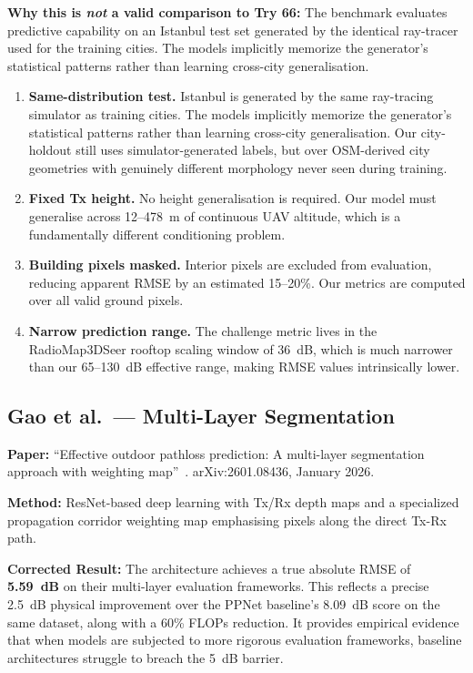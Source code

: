 \documentclass[11pt,a4paper]{article}
\begin{document}
\textbf{Why this is \emph{not} a valid comparison to Try 66:} The benchmark evaluates predictive capability on an Istanbul test set generated by the identical ray-tracer used for the training cities. The models implicitly memorize the generator's statistical patterns rather than learning cross-city generalisation.
\begin{enumerate}[nosep]
    \item \textbf{Same-distribution test.} Istanbul is generated by the same
          ray-tracing simulator as training cities. The models implicitly memorize
          the generator's statistical patterns rather than learning cross-city
          generalisation. Our city-holdout still uses simulator-generated labels,
          but over OSM-derived city geometries with genuinely different morphology
          never seen during training.

    \item \textbf{Fixed Tx height.} No height generalisation is required.
          Our model must generalise across 12--478~m of continuous UAV altitude,
          which is a fundamentally different conditioning problem.

    \item \textbf{Building pixels masked.} Interior pixels are excluded from
          evaluation, reducing apparent RMSE by an estimated 15--20\%. Our metrics
          are computed over all valid ground pixels.

    \item \textbf{Narrow prediction range.} The challenge metric lives in the
          RadioMap3DSeer rooftop scaling window of 36~dB, which is much narrower
          than our 65--130~dB effective range, making RMSE values intrinsically lower.
\end{enumerate}

\subsection{Gao et al.\ --- Multi-Layer Segmentation}

\textbf{Paper:} ``Effective outdoor pathloss prediction: A multi-layer segmentation
approach with weighting map''~\cite{gao2026}. arXiv:2601.08436, January 2026.

\textbf{Method:} ResNet-based deep learning with Tx/Rx depth maps and a specialized propagation corridor weighting map emphasising pixels along the direct Tx-Rx path.

\textbf{Corrected Result:} The architecture achieves a true absolute RMSE of \textbf{5.59~dB} on their multi-layer evaluation frameworks. This reflects a precise 2.5~dB physical improvement over the PPNet baseline's 8.09~dB score on the same dataset, along with a 60\% FLOPs reduction. It provides empirical evidence that when models are subjected to more rigorous evaluation frameworks, baseline architectures struggle to breach the 5~dB barrier.
\end{document}
